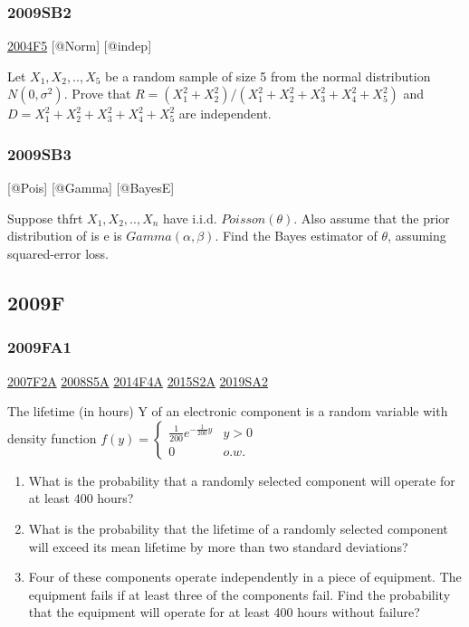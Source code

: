 \documentclass[6pt,Portrait]{article}
\begin{document}
\hypertarget{sb2}{%
\subsubsection{2009SB2}\label{sb2}}

\protect\hyperlink{f5-2}{2004F5} {[}@Norm{]} {[}@indep{]}

Let \(X_1,X_2,..,X_5\) be a random sample of size 5 from the normal
distribution \(N(0,\sigma^2)\). Prove that
\(R=(X_1^2+ X_2^2)/(X_1^2+ X_2^2+X_3^2+ X_4^2+X_5^2)\) and
\(D=X_1^2+ X_2^2+X_3^2+ X_4^2+X_5^2\) are independent.

\hypertarget{sb3}{%
\subsubsection{2009SB3}\label{sb3}}

{[}@Pois{]} {[}@Gamma{]} {[}@BayesE{]}

Suppose thfrt \(X_1,X_2,..,X_{n}\) have i.i.d. \(Poisson(\theta)\). Also
assume that the prior distribution of is e is \(Gamma(\alpha,\beta)\).
Find the Bayes estimator of \(\theta\), assuming squared-error loss.

\hypertarget{f-5}{%
\subsection{2009F}\label{f-5}}

\hypertarget{fa1}{%
\subsubsection{2009FA1}\label{fa1}}

\protect\hyperlink{f2a}{2007F2A} \protect\hyperlink{s5a}{2008S5A}
\protect\hyperlink{f4a-1}{2014F4A} \protect\hyperlink{s2a-1}{2015S2A}
\protect\hyperlink{sa2-3}{2019SA2}

The lifetime (in hours) Y of an electronic component is a random
variable with density function
\(f(y)=\begin{cases}\frac1{200}e^{-\frac1{200}y}& y>0\\0& o.w.\end{cases}\)

\begin{enumerate}
\def\labelenumi{(\alph{enumi})}
\item
  What is the probability that a randomly selected component will
  operate for at least 400 hours?
\item
  What is the probability that the lifetime of a randomly selected
  component will exceed its mean lifetime by more than two standard
  deviations?
\item
  Four of these components operate independently in a piece of
  equipment. The equipment fails if at least three of the components
  fail. Find the probability that the equipment will operate for at
  least 400 hours without failure?
\end{enumerate}
\end{document}
